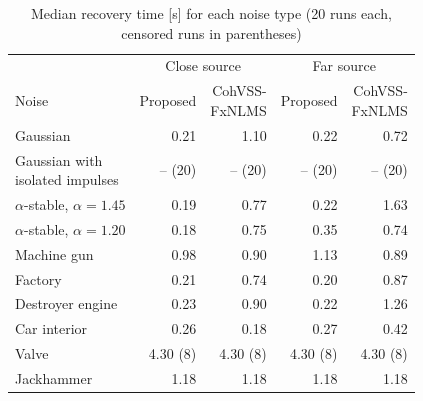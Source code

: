 \begin{table}[tbp]
\centering
\footnotesize
\setlength{\tabcolsep}{4pt}
\caption{Median recovery time [s] for each noise type (20 runs each, censored runs in parentheses)}
\label{tab:atsip-12}
\begin{tabular}{lrrrr}
\toprule
 & \multicolumn{2}{c}{Close source} & \multicolumn{2}{c}{Far source} \\
Noise & Proposed & \makecell[r]{CohVSS-\\FxNLMS} & Proposed & \makecell[r]{CohVSS-\\FxNLMS} \\
\midrule
Gaussian & 0.21 & 1.10 & 0.22 & 0.72 \\
\makecell[l]{Gaussian with\\isolated impulses} & -- (20) & -- (20) & -- (20) & -- (20) \\
$\alpha$-stable, $\alpha = 1.45$ & 0.19 & 0.77 & 0.22 & 1.63 \\
$\alpha$-stable, $\alpha = 1.20$ & 0.18 & 0.75 & 0.35 & 0.74 \\
Machine gun & 0.98 & 0.90 & 1.13 & 0.89 \\
Factory & 0.21 & 0.74 & 0.20 & 0.87 \\
Destroyer engine & 0.23 & 0.90 & 0.22 & 1.26 \\
Car interior & 0.26 & 0.18 & 0.27 & 0.42 \\
Valve & 4.30 (8) & 4.30 (8) & 4.30 (8) & 4.30 (8) \\
Jackhammer & 1.18 & 1.18 & 1.18 & 1.18 \\
\bottomrule
\end{tabular}
\par{}
\end{table}
